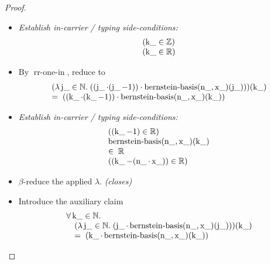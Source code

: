 \documentclass[11pt]{article}
\theoremstyle{plain}
\begin{document}
\begin{proof}
\begin{itemize}[leftmargin=2.8em, itemsep=4pt, parsep=1pt]
  \item[\textbf{121--123}] \emph{Establish in-carrier / typing side-conditions:}
\begin{equation*}
\begin{array}{@{}l@{}}
(\operatorname{k\_} \in \mathbb{Z}) \\
(\operatorname{k\_} \in \mathbb{R})
\end{array}
\end{equation*}

  \item[\textbf{124}] By $\operatorname{rr\text{-}one\text{-}in}$, reduce to
\begin{equation*}
\begin{array}{@{}l@{}} (\lambda \operatorname{j\_} \in \mathbb{N}.\; ((\operatorname{j\_} \cdot (\operatorname{j\_} - 1)) \cdot \operatorname{bernstein\text{-}basis}(\operatorname{n\_}, \operatorname{x\_})(\operatorname{j\_})))(\operatorname{k\_}) \\ =\; ((\operatorname{k\_} \cdot (\operatorname{k\_} - 1)) \cdot \operatorname{bernstein\text{-}basis}(\operatorname{n\_}, \operatorname{x\_})(\operatorname{k\_})) \end{array}
\end{equation*}

  \item[\textbf{125--127}] \emph{Establish in-carrier / typing side-conditions:}
\begin{equation*}
\begin{array}{@{}l@{}}
((\operatorname{k\_} - 1) \in \mathbb{R}) \\
\begin{array}{@{}l@{}} \operatorname{bernstein\text{-}basis}(\operatorname{n\_}, \operatorname{x\_})(\operatorname{k\_}) \\ \in\; \mathbb{R} \end{array} \\
((\operatorname{k\_} - (\operatorname{n\_} \cdot \operatorname{x\_})) \in \mathbb{R})
\end{array}
\end{equation*}

  \item[\textbf{128--129}] $\beta$-reduce the applied $\lambda$.  \emph{(closes)}
  \item[\textbf{130}] Introduce the auxiliary claim
\begin{equation*}
\begin{array}{@{}l@{}} \forall \operatorname{k\_} \in \mathbb{N}. \\ \quad (\lambda \operatorname{j\_} \in \mathbb{N}.\; (\operatorname{j\_} \cdot \operatorname{bernstein\text{-}basis}(\operatorname{n\_}, \operatorname{x\_})(\operatorname{j\_})))(\operatorname{k\_}) \\ \quad =\; (\operatorname{k\_} \cdot \operatorname{bernstein\text{-}basis}(\operatorname{n\_}, \operatorname{x\_})(\operatorname{k\_})) \end{array}
\end{equation*}


\end{itemize}
\end{proof}
\end{document}
